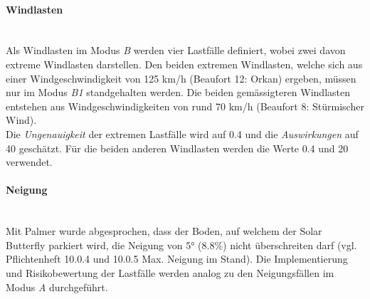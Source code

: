 \paragraph{Windlasten}\mbox{}\\
Als Windlasten im Modus \emph{B} werden vier Lastfälle definiert, wobei zwei davon \glqq extreme\grqq{} Windlasten darstellen. Den beiden extremen Windlasten, welche sich aus einer Windgeschwindigkeit von 125 km/h (Beaufort 12: Orkan) ergeben, müssen nur im Modus \emph{B1} standgehalten werden. Die beiden gemässigteren Windlasten entstehen aus Windgeschwindigkeiten von rund 70 km/h (Beaufort 8: Stürmischer Wind).\\
Die \emph{Ungenauigkeit} der extremen Lastfälle wird auf 0.4 und die \emph{Auswirkungen} auf 40 geschätzt. Für die beiden anderen Windlasten werden die Werte 0.4 und 20 verwendet.
%

\paragraph{Neigung}\mbox{}\\
Mit Palmer wurde abgesprochen, dass der Boden, auf welchem der Solar Butterfly parkiert wird, die Neigung von 5° (8.8\%) nicht überschreiten darf (vgl. Pflichtenheft 10.0.4 und 10.0.5 Max. Neigung im Stand). Die Implementierung und Risikobewertung der Lastfälle werden analog zu den Neigungsfällen im Modus \emph{A} durchgeführt.

